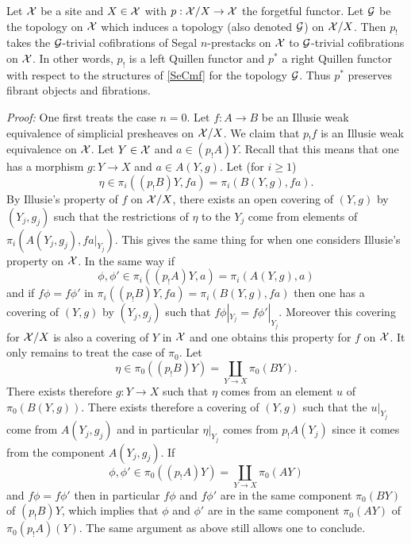 \begin{corollary}
\label{Gfibrestrict}
Let ${\cal X}$ be a site and $X\in {\cal X}$ with $p: {\cal X} /X\rightarrow {\cal X}$ the forgetful
functor. Let ${\cal G}$ be the topology on ${\cal X}$ which induces a topology (also
denoted ${\cal G}$) on ${\cal X} /X$. Then $p_!$ takes the ${\cal G}$-trivial cofibrations
of Segal $n$-prestacks
on ${\cal X}$ to ${\cal G}$-trivial cofibrations on ${\cal X} $.
In other words, $p_!$ is a left Quillen functor and $p^{\ast}$ a
right Quillen functor with respect to the structures of \ref{SeCmf} for the
topology ${\cal G}$. Thus $p^{\ast}$ preserves fibrant objects and
fibrations.
\end{corollary}
{\em Proof:}
One first treats the case $n=0$. Let $f:A\rightarrow B$ be an Illusie weak
equivalence of simplicial presheaves on ${\cal X} /X$. We claim that $p_!f$ is
an Illusie weak equivalence on ${\cal X}$. Let $Y\in {\cal X}$ and
$a\in (p_!A)Y$. Recall that this means that one has a morphism
$g: Y\rightarrow X$ and $a\in A(Y,g)$. Let (for $i\geq 1$)
$$
\eta \in \pi _i((p_!B )Y, fa) = \pi _i(B(Y,g), fa).
$$
By Illusie's property of $f$ on ${\cal X} / X$,
there exists an open covering of $(Y,g)$ by $(Y_j,g_j)$ such that
the restrictions of $\eta$ to the $Y_j$ come from elements of
$\pi _i (A(Y_j,g_j), fa|_{Y_j})$. This gives the same thing for when one
considers Illusie's property on ${\cal X}$. In the same way
if
$$
\phi ,\phi  '\in \pi _i((p_!A)Y, a) = \pi _i(A(Y,g), a)
$$
and if $f\phi = f\phi '$ in
$\pi _i((p_!B )Y, fa) = \pi _i(B(Y,g), fa)$ then
one has a covering of $(Y,g)$ by $(Y_j,g_j)$ such that
$f\phi |_{Y_j} = f\phi '|_{Y_j}$.  Moreover this covering for ${\cal X} / X$ is
also a covering of $Y$ in ${\cal X}$ and one obtains this property
for $f$ on ${\cal X}$. It only remains to treat the case of $\pi _0$. Let
$$
\eta \in \pi _0((p_!B)Y) = \coprod _{Y\rightarrow X}\pi _0(B Y).
$$
There exists therefore $g: Y\rightarrow X$ such that $\eta $ comes from an
element
$u$ of $\pi _0(B(Y,g))$. There exists therefore a covering of $(Y,g)$ such that
the
$u|_{Y_j}$ come from $A(Y_j,g_j)$ and in particular $\eta|_{Y_j}$ comes
from $p_!A(Y_j)$ since it comes from the component $A(Y_j,g_j)$.
If
$$
\phi , \phi '\in \pi _0((p_!A)Y) = \coprod _{Y\rightarrow X}\pi _0(A Y)
$$
and $f\phi =f\phi '$ then in particular $f\phi$ and $f\phi '$ are in the same
component $\pi _0(B Y)$ of $(p_!B)Y$, which implies that $\phi$ and $\phi'$
are in the same component $\pi _0(AY)$ of $\pi _0(p_!A)(Y)$. The same argument
as above still allows one to conclude.

